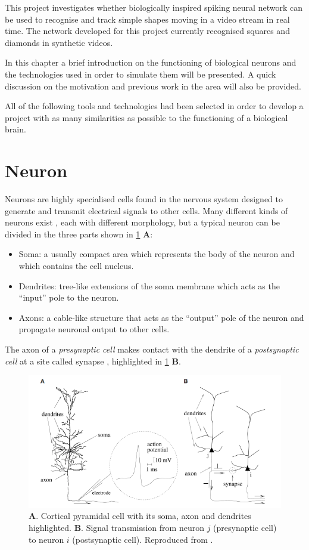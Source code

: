 This project investigates whether biologically inspired spiking neural network can be used to recognise and track simple shapes moving in a video stream in real time. The network developed for this project currently recognised squares and diamonds in synthetic videos. 

In this chapter a brief introduction on the functioning of biological neurons and the technologies used in order to simulate them will be presented. A quick discussion on the motivation and previous work in the area will also be provided. 

All of the following tools and technologies had been selected in order to develop a project with as many similarities as possible to the functioning of a biological brain. 


\section{Neuron}
Neurons are highly specialised cells found in the nervous system designed to generate and transmit electrical signals to other cells. Many different kinds of neurons exist \cite{Llinas:2008}, each with different morphology, but a typical neuron can be divided in the three parts shown in \cref{fig:neuron_morphology} \textbf{A}:
\begin{itemize}
    \item Soma: a usually compact area which represents the body of the neuron and which contains the cell nucleus.
    \item Dendrites: tree-like extensions of the soma membrane which acts as the ``input'' pole to the neuron.
    \item Axons: a cable-like structure that acts as the ``output'' pole of the neuron and propagate neuronal output to other cells.
\end{itemize}
The axon of a \textit{presynaptic cell} makes contact with the dendrite of a \textit{postsynaptic cell} at a site called synapse \cite{Gerstner:2014}, highlighted in \cref{fig:neuron_morphology} \textbf{B}.

\begin{figure}[ht]
\centering
\includegraphics[scale=0.6]{images/context/neuron.png}
\caption[Neuron Morphology]{\textbf{A}. Cortical pyramidal cell with its soma, axon and dendrites highlighted. \textbf{B}. Signal transmission from neuron $j$ (presynaptic cell) to neuron $i$ (postsynaptic cell). Reproduced from \cite{Gerstner:2014}.}
\label{fig:neuron_morphology}
\end{figure}

